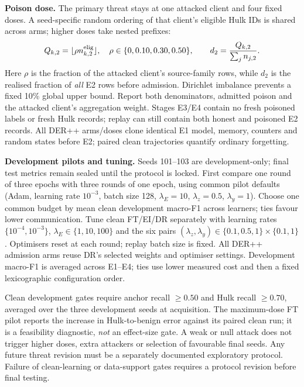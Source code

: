 \documentclass[10pt,a4paper]{article}
\begin{document}
\textbf{Poison dose.} The primary threat stays at one attacked client and four fixed doses. A seed-specific random ordering of that client's eligible Hulk IDs is shared across arms; higher doses take nested prefixes:
\begin{equation}
Q_{k,2}=\lfloor\rho n^{\rm elig}_{k,2}\rfloor,\quad
\rho\in\{0,0.10,0.30,0.50\},\qquad
d_2=\frac{Q_{k,2}}{\sum_j n_{j,2}}.
\label{eq:dose}
\end{equation}
Here $\rho$ is the fraction of the attacked client's source-family rows, while $d_2$ is the realised fraction of \emph{all} E2 rows before admission. Dirichlet imbalance prevents a fixed 10\% global upper bound. Report both denominators, admitted poison and the attacked client's aggregation weight. Stages E3/E4 contain no fresh poisoned labels or fresh Hulk records; replay can still contain both honest and poisoned E2 records. All DER++ arms/doses clone identical E1 model, memory, counters and random states before E2; paired clean trajectories quantify ordinary forgetting.

\textbf{Development pilots and tuning.} Seeds 101--103 are development-only; final test metrics remain sealed until the protocol is locked. First compare one round of three epochs with three rounds of one epoch, using common pilot defaults (Adam, learning rate $10^{-3}$, batch size 128, $\lambda_E=10$, $\lambda_z=0.5$, $\lambda_y=1$). Choose one common budget by mean clean development macro-F1 across learners; ties favour lower communication. Tune clean FT/EI/DR separately with learning rates $\{10^{-4},10^{-3}\}$, $\lambda_E\in\{1,10,100\}$ and the six pairs $(\lambda_z,\lambda_y)\in\{0.1,0.5,1\}\times\{0.1,1\}$. Optimisers reset at each round; replay batch size is fixed. All DER++ admission arms reuse DR's selected weights and optimiser settings. Development macro-F1 is averaged across E1--E4; ties use lower measured cost and then a fixed lexicographic configuration order.

Clean development gates require anchor recall $\ge0.50$ and Hulk recall $\ge0.70$, averaged over the three development seeds at acquisition. The maximum-dose FT pilot reports the increase in Hulk-to-benign error against its paired clean run; it is a feasibility diagnostic, \emph{not} an effect-size gate. A weak or null attack does not trigger higher doses, extra attackers or selection of favourable final seeds. Any future threat revision must be a separately documented exploratory protocol. Failure of clean-learning or data-support gates requires a protocol revision before final testing.
\end{document}

